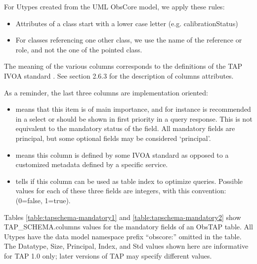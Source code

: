 \documentclass[11pt,a4paper]{ivoa}
\begin{document}
For Utypes created from the UML ObsCore model, we apply these rules:

\begin{itemize}
\item Attributes of a class start with a lower case letter (e.g. calibrationStatus)
\item For classes referencing one other class, we use the name of the reference or role, and not the one of the pointed
class.
\end{itemize}

The meaning of the various columns corresponds to the definitions of the TAP IVOA standard \citep{2010ivoa.spec.0327D}. See
section 2.6.3 for the description of columns attributes.

As a reminder, the last three columns are implementation oriented:

\begin{itemize}
\item[`principal':] means that this item is of main importance, and for instance is recommended in a select or should be
shown in first priority in a query response.
This is not equivalent to the mandatory status of the field. All mandatory fields are principal, but some optional
fields may be considered `principal'.

\item[`std':] means this column is defined by some IVOA standard as opposed to a customized metadata defined by a specific
service.

\item[`indexed':] tells if this column can be used as table index to optimize queries. Possible values for each of these
three fields are integers, with this convention: (0=false, 1=true).
\end{itemize}

Tables \ref{table:tapschema-mandatory1} and \ref{table:tapschema-mandatory2} show TAP\_SCHEMA.columns values for the mandatory fields of an ObsTAP table. All Utypes have the data model
namespace prefix {}``obscore:'' omitted in the table. The Datatype, Size, Principal, Index, and Std values shown here
are informative for TAP 1.0 only; later versions of TAP may specify different values.
\end{document}
